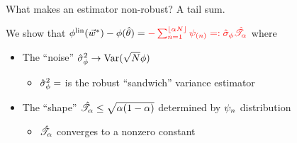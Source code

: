





\begin{frame}{What makes an estimator non-robust?  A tail sum.}

We show that \hspace{1em}
%
$
%
\thetafunlin(\w^*) - \thetafun(\thetahat)  =
{\color{red}
    - \sum_{n=1}^{\lfloor \alpha N \rfloor} \infl_{(n)}
    =:  \noise \shape}
%
$
%
\hspace{1em} where \vspace{1em}

\begin{itemize}
\item The ``noise'' $\hat\sigma_{\phi}^2 \rightarrow \mathrm{Var}(\sqrt{N}\phi)$
    \begin{itemize}
        \item $\hat\sigma_{\phi}^2 = $ is the robust ``sandwich'' variance estimator
        \citep{hampel1986robustbook}
    \end{itemize}
\item The ``shape'' $\hat{\mathscr{T}}_\alpha \le \sqrt{\alpha (1 - \alpha)}$
    determined by $\psi_n$ distribution
    \begin{itemize}
        \item $\hat{\mathscr{T}}_\alpha$ converges to a nonzero constant
    \end{itemize}
\end{itemize}


\end{frame}
